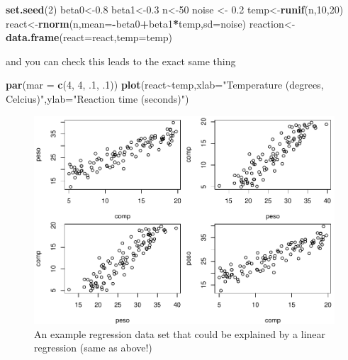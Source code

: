 \documentclass[
]{book}
\newenvironment{Shaded}{\begin{snugshade}}{\end{snugshade}}
\newcommand{\AttributeTok}[1]{\textcolor[rgb]{0.13,0.29,0.53}{#1}}
\newcommand{\DecValTok}[1]{\textcolor[rgb]{0.00,0.00,0.81}{#1}}
\newcommand{\FloatTok}[1]{\textcolor[rgb]{0.00,0.00,0.81}{#1}}
\newcommand{\FunctionTok}[1]{\textcolor[rgb]{0.13,0.29,0.53}{\textbf{#1}}}
\newcommand{\NormalTok}[1]{#1}
\newcommand{\OtherTok}[1]{\textcolor[rgb]{0.56,0.35,0.01}{#1}}
\newcommand{\SpecialCharTok}[1]{\textcolor[rgb]{0.81,0.36,0.00}{\textbf{#1}}}
\newcommand{\StringTok}[1]{\textcolor[rgb]{0.31,0.60,0.02}{#1}}
\begin{document}
\begin{Shaded}
\begin{Highlighting}[]
\FunctionTok{set.seed}\NormalTok{(}\DecValTok{2}\NormalTok{)}
\NormalTok{beta0}\OtherTok{\textless{}{-}}\FloatTok{0.8}
\NormalTok{beta1}\OtherTok{\textless{}{-}}\FloatTok{0.3}
\NormalTok{n}\OtherTok{\textless{}{-}}\DecValTok{50}
\NormalTok{noise }\OtherTok{\textless{}{-}} \FloatTok{0.2}
\NormalTok{temp}\OtherTok{\textless{}{-}}\FunctionTok{runif}\NormalTok{(n,}\DecValTok{10}\NormalTok{,}\DecValTok{20}\NormalTok{)}
\NormalTok{react}\OtherTok{\textless{}{-}}\FunctionTok{rnorm}\NormalTok{(n,}\AttributeTok{mean=}\SpecialCharTok{{-}}\NormalTok{beta0}\SpecialCharTok{+}\NormalTok{beta1}\SpecialCharTok{*}\NormalTok{temp,}\AttributeTok{sd=}\NormalTok{noise)}
\NormalTok{reaction}\OtherTok{\textless{}{-}}\FunctionTok{data.frame}\NormalTok{(}\AttributeTok{react=}\NormalTok{react,}\AttributeTok{temp=}\NormalTok{temp)}
\end{Highlighting}
\end{Shaded}

and you can check this leads to the exact same thing

\begin{Shaded}
\begin{Highlighting}[]
\FunctionTok{par}\NormalTok{(}\AttributeTok{mar =} \FunctionTok{c}\NormalTok{(}\DecValTok{4}\NormalTok{, }\DecValTok{4}\NormalTok{, .}\DecValTok{1}\NormalTok{, .}\DecValTok{1}\NormalTok{))}
\FunctionTok{plot}\NormalTok{(react}\SpecialCharTok{\textasciitilde{}}\NormalTok{temp,}\AttributeTok{xlab=}\StringTok{"Temperature (degrees, Celcius)"}\NormalTok{,}\AttributeTok{ylab=}\StringTok{"Reaction time (seconds)"}\NormalTok{)}
\end{Highlighting}
\end{Shaded}

\begin{figure}

{\centering \includegraphics[width=0.8\linewidth]{ECOMODbook_files/figure-latex/unnamed-chunk-1-1} 

}

\caption{An example regression data set that could be explained by a linear regression (same as above!)}\label{fig:unnamed-chunk-1}
\end{figure}
\end{document}
